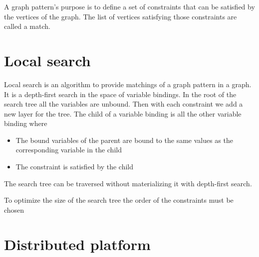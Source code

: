A graph pattern's purpose is to define a set of constraints that can be satisfied by the vertices of the graph. The list of vertices satisfying those constraints are called a match.

\section{Local search}

Local search is an algorithm to provide matchings of a graph pattern in a graph. It is a depth-first search in the space of variable bindings. In the root of the search tree all the variables are unbound. Then with each constraint we add a new layer for the tree. The child of a variable binding is all the other variable binding where 
\begin{itemize}
	\item The bound variables of the parent are bound to the same values as the corresponding variable in the child
	\item The constraint is satisfied by the child
\end{itemize}

The search tree can be traversed without materializing it with depth-first search. 

To optimize the size of the search tree the order of the constraints must be chosen 

\section{Distributed platform}



